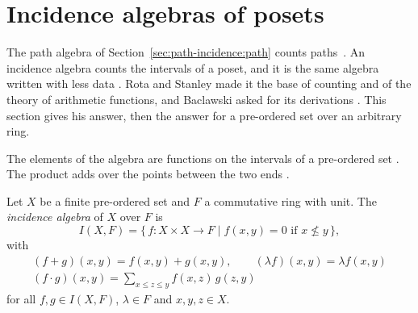 \section{Incidence algebras of posets}\label{sec:path-incidence:incidence}

The path algebra of Section~\ref{sec:path-incidence:path} counts paths~\cite[p.~1358]{Xiao2015}. An
incidence algebra counts the intervals of a poset, and it is the same algebra
written with less data \cite[p.~232]{Ortega2006}. Rota and Stanley made it the
base of counting and of the theory of arithmetic functions, and Baclawski
asked for its derivations \cite[p.~1358]{Xiao2015}. This section gives his
answer, then the answer for a pre-ordered set over an arbitrary ring.

The elements of the algebra are functions on the intervals of a pre-ordered
set \cite[p.~230]{Ortega2006}. The product adds over the points between the
two ends \cite[p.~230]{Ortega2006}.

\begin{definition}\label{def:incidence:algebra}
Let $X$ be a finite pre-ordered set and $F$ a commutative ring with unit. The
\emph{incidence algebra} of $X$ over $F$ is
\begin{equation*}
I(X,F)=\{\,f\colon X\times X\to F\mid f(x,y)=0\text{ if }x\not\le y\,\},
\end{equation*}
with
\begin{gather*}
(f+g)(x,y)=f(x,y)+g(x,y),\qquad
(\lambda f)(x,y)=\lambda f(x,y)\\
(f\cdot g)(x,y)=\sum_{x\le z\le y}f(x,z)\,g(z,y)
\end{gather*}
for all $f,g\in I(X,F)$, $\lambda\in F$ and $x,y,z\in X$.
\end{definition}

